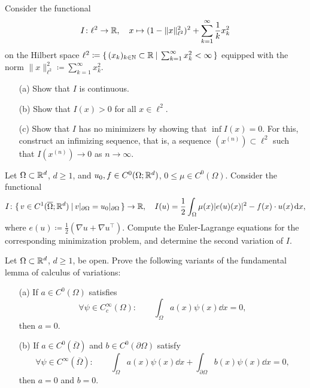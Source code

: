 \documentclass[12pt,a4paper]{article}
\begin{document}

\setcounter{AUFGABE}{3}

Consider the functional
\[
I\colon\ell^2\to{\mathbb R},
\quad 
x\mapsto (1-\|x\|_{\ell^2}^2)^2
+\sum_{k=1}^\infty \frac{1}{k}x_k^2
\]
on the Hilbert space
$\ell^2\coloneqq\{\, (x_k)_{k\in{\mathbb N}}\subset{\mathbb R} \: | \: \sum_{k=1}^\infty x_k^2<\infty \,\}$
equipped with the norm 
$\|x\|^2_{\ell^2}\coloneqq\sum_{k=1}^\infty x_k^2$.
\begin{enumerate}
    \item [(a)]
    Show that $I$ is continuous.
    \item [(b)]
    Show that $I(x)>0$ for all $x\in\ell^2$.
    \item [(c)]
    Show that $I$ has no minimizers by showing that $\inf I(x)=0$.
    For this, construct an infimizing sequence,
    that is, a sequence $(x^{(n)})\subset \ell^2$ such that
    $I(x^{(n)})\to 0$ as $n\to\infty$.
\end{enumerate}

Let $\Omega\subset{\mathbb R}^d$, $d\geq 1$, and $u_0, f\in C^{0}(\Omega;{\mathbb R}^d)$, 
$0\leq\mu\in C^{0}(\Omega)$.
Consider the functional 
\[
I\colon 
\{\, v\in C^1(\overline{\Omega};{\mathbb R}^d) \: | \: v|_{\partial\Omega}=u_0|_{\partial\Omega} \,\}
\to{\mathbb R},
\quad
I(u)=\frac{1}{2}\int_\Omega\mu(x) |e(u)(x)|^2 - f(x)\cdot u(x)\;\!\mathrm{d} x,
\]
where $e(u)\coloneqq \frac{1}{2}( \nabla u + \nabla u^\top)$.
Compute the Euler-Lagrange equations for the corresponding minimization problem,
and determine the second variation of $I$.

Let $\Omega\subset{\mathbb R}^d$, $d\geq 1$, be open.
Prove the following variants of the fundamental lemma of calculus of variations:
\begin{enumerate}
    \item [(a)]
    If $a\in C^0(\Omega)$
    satisfies
    \[
    \forall \psi\in
    C_c^\infty(\Omega):
    \qquad
    \int_\Omega a(x)\psi(x)\dd x=0,
    \]
    then $a=0$.
    \item[(b)]
    If $a\in C^0(\overline{\Omega})$
    and $b\in C^0(\partial\Omega)$
    satisfy
    \[
    \forall \psi\in
    C^\infty(\overline{\Omega}):
    \qquad
    \int_\Omega a(x)\psi(x)\dd x
    +\int_{\partial\Omega} b(x)\psi(x)\dd x=0,
    \]
    then $a=0$ and $b=0$.
\end{enumerate}
\end{document}
